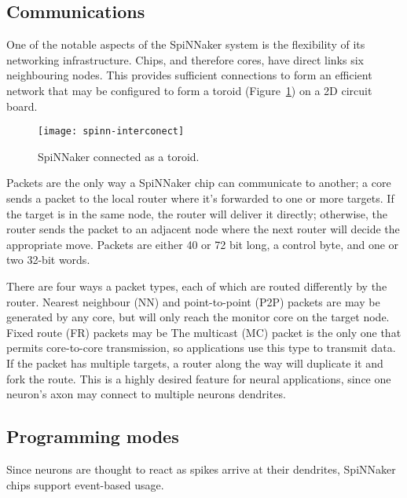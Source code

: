 \subsection{Communications}

One of the notable aspects of the SpiNNaker system is the flexibility of its networking infrastructure. Chips, and therefore cores, have direct links six neighbouring nodes. This provides sufficient connections to form an efficient network that may be configured to form a toroid (Figure~\ref{fig:hw:spinn-toroid}) on a 2D circuit board.

\begin{figure}[h]
  \begin{center}
    \texttt{[image: spinn-interconect]}
    \caption{SpiNNaker connected as a toroid.}
    \label{fig:hw:spinn-toroid}
  \end{center}
\end{figure}

Packets are the only way a SpiNNaker chip can communicate to another; a core sends a packet to the local router where it's forwarded to one or more targets. If the target is in the same node, the router will deliver it directly; otherwise, the router sends the packet to an adjacent node where the next router will decide the appropriate move. Packets are either 40 or 72 bit long, a control byte, and one or two 32-bit words.

There are four ways a packet types, each of which are routed differently by the router. Nearest neighbour (NN) and point-to-point (P2P) packets are may be generated by any core, but will only reach the monitor core on the target node. 
Fixed route (FR) packets may be 
The multicast (MC) packet is the only one that permits core-to-core transmission, so applications use this type to transmit data. If the packet has multiple targets, a router along the way will duplicate it and fork the route. This is a highly desired feature for neural applications, since one neuron's axon may connect to multiple neurons dendrites.


\subsection{Programming modes}
Since neurons are thought to react as spikes arrive at their dendrites, SpiNNaker chips support event-based usage.